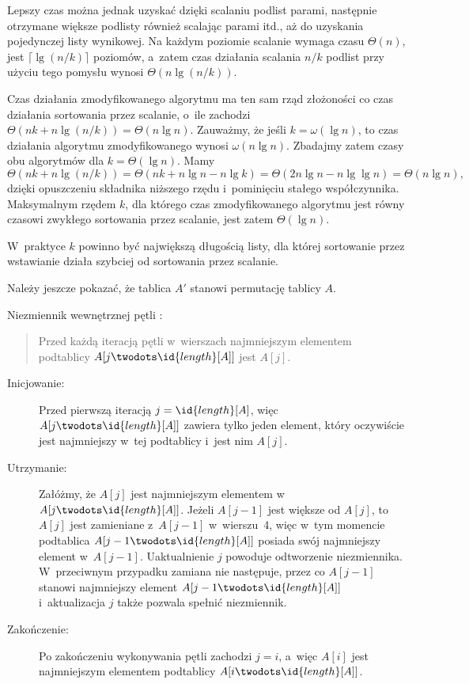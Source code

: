 Lepszy czas można jednak uzyskać dzięki scalaniu podlist parami, następnie otrzymane większe podlisty również scalając parami itd., aż do uzyskania pojedynczej listy wynikowej. Na każdym poziomie scalanie wymaga czasu $\Theta(n)$, jest $\lceil\lg(n/k)\rceil$ poziomów, a~zatem czas działania scalania $n/k$ podlist przy użyciu tego pomysłu wynosi $\Theta(n\lg(n/k))$.

\subproblem %
Czas działania zmodyfikowanego algorytmu ma ten sam rząd złożoności co czas działania sortowania przez scalanie, o~ile zachodzi $\Theta(nk+n\lg(n/k))=\Theta(n\lg n)$. Zauważmy, że jeśli $k=\omega(\lg n)$, to czas działania algorytmu zmodyfikowanego wynosi $\omega(n\lg n)$. Zbadajmy zatem czasy obu algorytmów dla $k=\Theta(\lg n)$. Mamy
\[
	\Theta(nk+n\lg(n/k)) = \Theta(nk+n\lg n-n\lg k) = \Theta(2n\lg n-n\lg\lg n) = \Theta(n\lg n),
\]
dzięki opuszczeniu składnika niższego rzędu i~pominięciu stałego współczynnika. Maksymalnym rzędem $k$, dla którego czas zmodyfikowanego algorytmu jest równy czasowi zwykłego sortowania przez scalanie, jest zatem $\Theta(\lg n)$.

\subproblem %
W~praktyce $k$ powinno być największą długością listy, dla której sortowanie przez wstawianie działa szybciej od sortowania przez scalanie.


\subproblem %
Należy jeszcze pokazać, że tablica $A'$ stanowi permutację tablicy $A$.

\subproblem %
Niezmiennik wewnętrznej pętli :
\begin{quote}
Przed każdą iteracją pętli  w~wierszach  najmniejszym elementem podtablicy $A[j\twodots\id{length}[A]]$ jest $A[j]$.
\end{quote}
\begin{description}
	\item[Inicjowanie:] Przed pierwszą iteracją $j=\id{length}[A]$, więc $A[j\twodots\id{length}[A]]$ zawiera tylko jeden element, który oczywiście jest najmniejszy w~tej podtablicy i~jest nim $A[j]$.
	\item[Utrzymanie:] Załóżmy, że $A[j]$ jest najmniejszym elementem w~$A[j\twodots\id{length}[A]]$. Jeżeli $A[j-1]$ jest większe od $A[j]$, to $A[j]$ jest zamieniane z~$A[j-1]$ w~wierszu~4, więc w~tym momencie podtablica $A[j-1\twodots\id{length}[A]]$ posiada swój najmniejszy element w~$A[j-1]$. Uaktualnienie $j$ powoduje odtworzenie niezmiennika. W~przeciwnym przypadku zamiana nie następuje, przez co $A[j-1]$ stanowi najmniejszy element $A[j-1\twodots\id{length}[A]]$ i~aktualizacja $j$ także pozwala spełnić niezmiennik.
	\item[Zakończenie:] Po zakończeniu wykonywania pętli zachodzi $j=i$, a~więc $A[i]$ jest najmniejszym elementem podtablicy $A[i\twodots\id{length}[A]]$.
\end{description}

